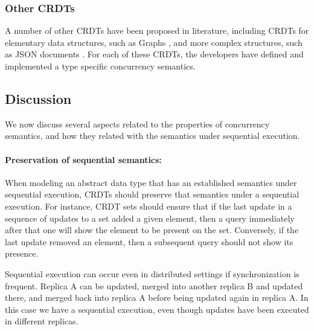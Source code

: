 \documentclass[11pt,a4paper]{article}
\begin{document}
\subsubsection{Other CRDTs} 
A number of other CRDTs have been proposed in literature, including 
CRDTs for elementary data structures, such as Graphs \cite{Shapiro11Conflict}, and more
complex structures, such as JSON documents \cite{Kleppmann17JSON}.
For each of these CRDTs, the developers have defined and implemented a type specific 
concurrency semantics.

\subsection{Discussion}

We now discuss several aspects related to the properties of concurrency semantics,
and how they related with the semantics under sequential execution.


\paragraph{Preservation of sequential semantics:}
When modeling an abstract data type that has an established semantics 
under sequential execution, CRDTs should preserve that semantics under a
sequential execution. 
For instance, CRDT sets should ensure that if the last update in a sequence 
of updates to a set added a given element, then a query immediately 
after that one will show the element to be present on the set. 
Conversely, if the last update removed an element, then a subsequent 
query should not show its presence. 

Sequential execution can occur even in distributed settings if 
synchronization is frequent. 
Replica A can be updated, merged into another replica B and updated there, 
and merged back into replica A before being updated again in replica A. 
In this case we have a sequential execution, even though updates 
have been executed in different replicas.
\end{document}
